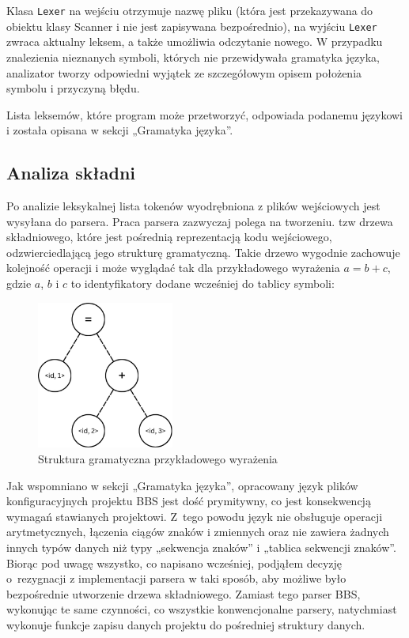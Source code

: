 Klasa \texttt{Lexer} na wejściu otrzymuje nazwę pliku (która jest przekazywana do obiektu klasy Scanner i nie jest zapisywana bezpośrednio), na wyjściu \texttt{Lexer} zwraca aktualny leksem, a także umożliwia odczytanie nowego. W przypadku znalezienia nieznanych symboli, których nie przewidywała gramatyka języka, analizator tworzy odpowiedni wyjątek ze szczegółowym opisem położenia symbolu i przyczyną błędu.

Lista leksemów, które program może przetworzyć, odpowiada podanemu językowi i została opisana w sekcji „Gramatyka języka”.

\subsection{Analiza składni}

Po analizie leksykalnej lista tokenów wyodrębniona z plików wejściowych jest wysyłana do parsera. Praca parsera zazwyczaj polega na tworzeniu. tzw drzewa składniowego, które jest pośrednią reprezentacją kodu wejściowego, odzwierciedlającą jego strukturę gramatyczną. Takie drzewo wygodnie zachowuje kolejność operacji i może wyglądać tak dla przykładowego wyrażenia $a = b + c$, gdzie $a$, $b$ i $c$ to identyfikatory dodane wcześniej do tablicy symboli:

\begin{figure}[h]
    \centering
    \includegraphics[width=0.4\textwidth]{Images/syntax_tree.png}
    \caption{Struktura gramatyczna przykładowego wyrażenia}
\end{figure}

Jak wspomniano w sekcji „Gramatyka języka”, opracowany język plików konfiguracyjnych projektu BBS jest dość prymitywny, co jest konsekwencją wymagań stawianych projektowi. Z~tego powodu język nie obsługuje operacji arytmetycznych, łączenia ciągów znaków i zmiennych oraz nie zawiera żadnych innych typów danych niż typy „sekwencja znaków” i „tablica sekwencji znaków”. Biorąc pod uwagę wszystko, co napisano wcześniej, podjąłem decyzję o~rezygnacji z implementacji parsera w taki sposób, aby możliwe było bezpośrednie utworzenie drzewa składniowego. Zamiast tego parser BBS, wykonując te same czynności, co wszystkie konwencjonalne parsery, natychmiast wykonuje funkcje zapisu danych projektu do pośredniej struktury danych.

